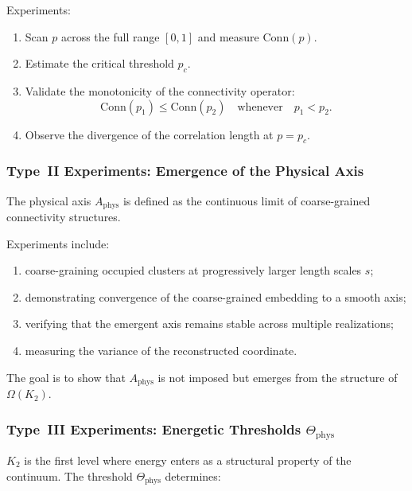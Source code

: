 Experiments:

\begin{enumerate}
    \item Scan $p$ across the full range $[0,1]$ and measure $\mathrm{Conn}(p)$.
    \item Estimate the critical threshold $p_c$.
    \item Validate the monotonicity of the connectivity operator:
          \[
             \mathrm{Conn}(p_1) \le \mathrm{Conn}(p_2)
             \quad \text{whenever} \quad p_1 < p_2.
          \]
    \item Observe the divergence of the correlation length at $p = p_c$.
\end{enumerate}



\subsubsection{Type~II Experiments: Emergence of the Physical Axis}

The physical axis $A_{\mathrm{phys}}$ is defined as the continuous limit of
coarse-grained connectivity structures.

Experiments include:

\begin{enumerate}
    \item coarse-graining occupied clusters at progressively larger length
          scales $s$;
    \item demonstrating convergence of the coarse-grained embedding to a
          smooth axis;
    \item verifying that the emergent axis remains stable across multiple
          realizations;
    \item measuring the variance of the reconstructed coordinate.
\end{enumerate}

The goal is to show that $A_{\mathrm{phys}}$ is not imposed but emerges
from the structure of $\Omega(K_2)$.



\subsubsection{Type~III Experiments: Energetic Thresholds $\Theta_{\mathrm{phys}}$}

$K_2$ is the first level where energy enters as a structural property of the
continuum.
The threshold $\Theta_{\mathrm{phys}}$ determines:

